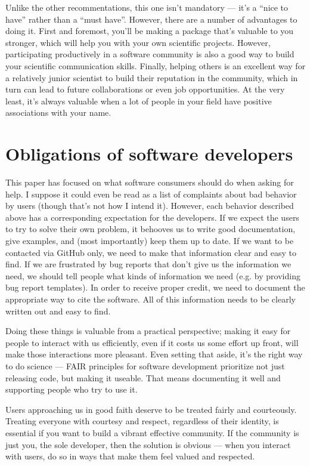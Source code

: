 \documentclass[9pt,training]{livecoms}
\begin{document}
Unlike the other recommentations, this one isn't mandatory --- it's a ``nice to
have'' rather than a ``must have''. However, there are a number of advantages to
doing it. First and foremost, you'll be making a package that's valuable to you
stronger, which will help you with your own scientific projects. However,
participating productively in a software community is also a good way to build
your scientific communication skills. Finally, helping others is an excellent
way for a relatively junior scientist to build their reputation in the
community, which in turn can lead to future collaborations or even job
opportunities. At the very least, it's always valuable when a lot of people in
your field have positive associations with your name.

\section{Obligations of software developers}

This paper has focused on what software consumers should do when asking for
help.  I suppose it could even be read as a list of complaints about bad
behavior by users (though that's not how I intend it). However, each behavior
described above has a corresponding expectation for the developers. If we expect
the users to try to solve their own problem, it behooves us to write good
documentation, give examples, and (most importantly) keep them up to date. If we
want to be contacted via GitHub only, we need to make that information clear and
easy to find. If we are frustrated by bug reports that don't give us the
information we need, we should tell people what kinds of information we need
(e.g. by providing bug report templates). In order to receive proper credit, we
need to document the appropriate way to cite the software. All of this
information needs to be clearly written out and easy to find.

Doing these things is valuable from a practical perspective; making it easy for
people to interact with us efficiently, even if it costs us some effort up
front, will make those interactions more pleasant. Even setting that aside, it's
the right way to do science --- FAIR principles for software development
\cite{Lamprecht-2020} prioritize not just releasing code, but making it useable.
That means documenting it well and supporting people who try to use it.

Users approaching us in good faith deserve to be treated fairly and courteously.
Treating everyone with courtesy and respect, regardless of their identity, is
essential if you want to build a vibrant effective community.  If the community
is just you, the sole developer, then the solution is obvious --- when you
interact with users, do so in ways that make them feel valued and respected.
\end{document}
